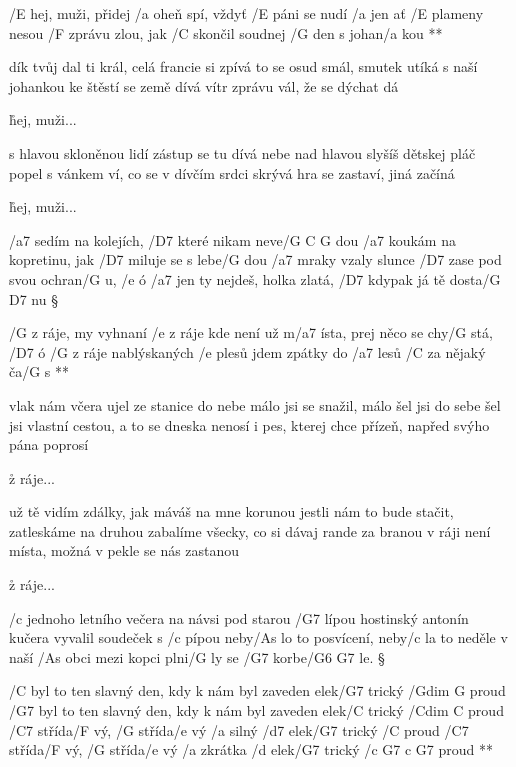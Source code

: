 \R /E hej, muži, přidej /a oheň spí, vždyť /E páni se nudí /a jen
   ať /E plameny nesou /F zprávu zlou, jak /C skončil
   soudnej /G den
   s johan/a kou **

dík tvůj dal ti král, celá francie si zpívá
to se osud smál, smutek utíká
s naší johankou ke štěstí se země dívá
vítr zprávu vál, že se dýchat dá \s

\r hej, muži...

s hlavou skloněnou lidí zástup se tu dívá
nebe nad hlavou slyšíš dětskej pláč
popel s vánkem ví, co se v dívčím srdci skrývá
hra se zastaví, jiná začíná \s

\r hej, muži...




/a7 sedím na kolejích, /D7 které nikam neve/{G C G} dou
/a7 koukám na kopretinu, jak /D7 miluje se s lebe/G dou
/a7 mraky vzaly slunce /D7 zase pod svou ochran/G u, /e ó
/a7 jen ty nejdeš, holka zlatá, /D7 kdypak já tě dosta/{G D7} nu \S

\R /G z ráje, my vyhnaní /e z ráje
   kde není už m/a7 ísta, prej něco se chy/G stá, /D7 ó
   /G z ráje nablýskaných /e plesů
   jdem zpátky do /a7 lesů /C za nějaký ča/G s **

vlak nám včera ujel ze stanice do nebe
málo jsi se snažil, málo šel jsi do sebe
šel jsi vlastní cestou, a to se dneska nenosí
i pes, kterej chce přízeň, napřed svýho pána poprosí \s

\r z ráje...

už tě vidím zdálky, jak máváš na mne korunou
jestli nám to bude stačit, zatleskáme na druhou
zabalíme všecky, co si dávaj rande za branou
v ráji není místa, možná v pekle se nás zastanou \s

\r z ráje...




/c jednoho letního večera na návsi pod starou /G7 lípou
hostinský antonín kučera vyvalil soudeček s /c pípou
neby/As lo to posvícení, neby/c la to neděle
v naší /As obci mezi kopci plni/G ly se /G7 korbe/{G6 G7} le. \S

\R /C byl to ten slavný den, kdy k nám byl zaveden
   elek/G7 trický /{Gdim G} proud
   /G7 byl to ten slavný den, kdy k nám byl zaveden
   elek/C trický /{Cdim C} proud
   /C7 střída/F vý,  /G střída/e vý
   /a silný /d7 elek/G7 trický /C proud
   /C7 střída/F vý,  /G střída/e vý
   /a zkrátka /d elek/G7 trický /{c G7 c G7} proud **

